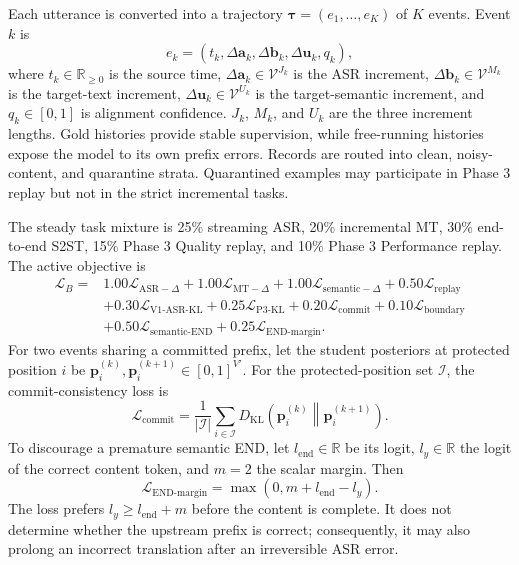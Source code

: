 \documentclass[11pt,a4paper]{article}
\newcommand{\vect}[1]{\bm{#1}}
\newcommand{\R}{\mathbb{R}}
\newcommand{\Vocab}{\mathcal{V}}
\newcommand{\Loss}{\mathcal{L}}
\newcommand{\KL}{D_{\mathrm{KL}}}
\begin{document}
Each utterance is converted into a trajectory $\vect{\tau}=(e_1,\ldots,e_K)$ of $K$ events. Event $k$ is
\begin{equation}
 e_k=(t_k,\Delta\vect{a}_k,\Delta\vect{b}_k,
 \Delta\vect{u}_k,q_k),
 \label{eq:event}
\end{equation}
where $t_k\in\R_{\ge0}$ is the source time, $\Delta\vect{a}_k\in\Vocab^{J_k}$ is the ASR increment, $\Delta\vect{b}_k\in\Vocab^{M_k}$ is the target-text increment, $\Delta\vect{u}_k\in\Vocab^{U_k}$ is the target-semantic increment, and $q_k\in[0,1]$ is alignment confidence. $J_k$, $M_k$, and $U_k$ are the three increment lengths. Gold histories provide stable supervision, while free-running histories expose the model to its own prefix errors. Records are routed into clean, noisy-content, and quarantine strata. Quarantined examples may participate in Phase 3 replay but not in the strict incremental tasks.

The steady task mixture is 25\% streaming ASR, 20\% incremental MT, 30\% end-to-end S2ST, 15\% Phase 3 Quality replay, and 10\% Phase 3 Performance replay. The active objective is
\begin{align}
 \Loss_B={}&1.00\Loss_{\mathrm{ASR}-\Delta}
 +1.00\Loss_{\mathrm{MT}-\Delta}
 +1.00\Loss_{\mathrm{semantic}-\Delta}
 +0.50\Loss_{\mathrm{replay}}\nonumber\\
 &+0.30\Loss_{\mathrm{V1\text{-}ASR\text{-}KL}}
 +0.25\Loss_{\mathrm{P3\text{-}KL}}
 +0.20\Loss_{\mathrm{commit}}
 +0.10\Loss_{\mathrm{boundary}}\nonumber\\
 &+0.50\Loss_{\mathrm{semantic\text{-}END}}
 +0.25\Loss_{\mathrm{END\text{-}margin}}.
 \label{eq:stageb}
\end{align}
For two events sharing a committed prefix, let the student posteriors at protected position $i$ be $\vect{p}^{(k)}_i,\vect{p}^{(k+1)}_i\in[0,1]^{V'}$. For the protected-position set $\mathcal{I}$, the commit-consistency loss is
\begin{equation}
 \Loss_{\mathrm{commit}}=
 \frac{1}{|\mathcal{I}|}\sum_{i\in\mathcal{I}}
 \KL\!\left(\vect{p}^{(k)}_i\middle\|\vect{p}^{(k+1)}_i\right).
 \label{eq:commitkl}
\end{equation}
To discourage a premature semantic END, let $l_{\mathrm{end}}\in\R$ be its logit, $l_y\in\R$ the logit of the correct content token, and $m=2$ the scalar margin. Then
\begin{equation}
 \Loss_{\mathrm{END\text{-}margin}}
 =\max\left(0,m+l_{\mathrm{end}}-l_y\right).
 \label{eq:endmargin}
\end{equation}
The loss prefers $l_y\ge l_{\mathrm{end}}+m$ before the content is complete. It does not determine whether the upstream prefix is correct; consequently, it may also prolong an incorrect translation after an irreversible ASR error.
\end{document}
